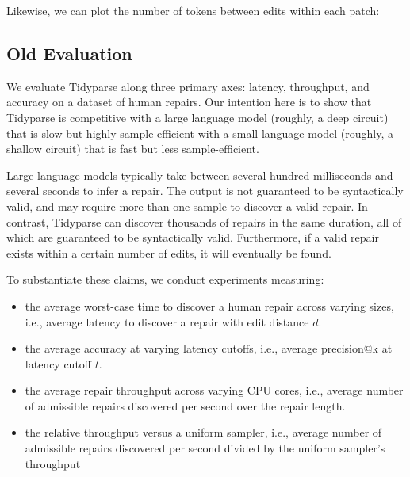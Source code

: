 \documentclass[sigplan,review,anonymous,acmsmall]{acmart}\settopmatter{printfolios=false,printccs=false,printacmref=false}
\begin{document}
  \noindent Likewise, we can plot the number of tokens between edits within each patch:

  \begin{figure}
  \end{figure}

  

  \subsection{Old Evaluation}

  We evaluate Tidyparse along three primary axes: latency, throughput, and accuracy on a dataset of human repairs. Our intention here is to show that Tidyparse is competitive with a large language model (roughly, a deep circuit) that is slow but highly sample-efficient with a small language model (roughly, a shallow circuit) that is fast but less sample-efficient.

  Large language models typically take between several hundred milliseconds and several seconds to infer a repair. The output is not guaranteed to be syntactically valid, and may require more than one sample to discover a valid repair. In contrast, Tidyparse can discover thousands of repairs in the same duration, all of which are guaranteed to be syntactically valid. Furthermore, if a valid repair exists within a certain number of edits, it will eventually be found.

  To substantiate these claims, we conduct experiments measuring:

  \begin{itemize}
    \item the average worst-case time to discover a human repair across varying sizes, i.e., average latency to discover a repair with edit distance $d$.
    \item the average accuracy at varying latency cutoffs, i.e., average precision@k at latency cutoff $t$.
    \item the average repair throughput across varying CPU cores, i.e., average number of admissible repairs discovered per second over the repair length.
    \item the relative throughput versus a uniform sampler, i.e., average number of admissible repairs discovered per second divided by the uniform sampler's throughput
  \end{itemize}
\end{document}
